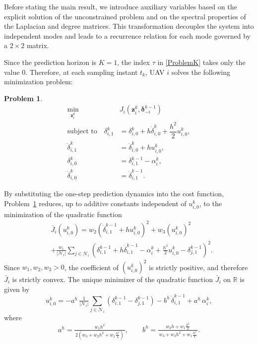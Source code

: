 \documentclass[letterpaper,journal]{IEEEtran}
\newtheorem{problem}{Problem}
\begin{document}
Before stating the main result, we introduce auxiliary variables based on the explicit solution of the unconstrained problem and on the spectral properties of the Laplacian and degree matrices. This transformation decouples the system into independent modes and leads to a recurrence relation for each mode governed by a \(2\times 2\) matrix.

Since the prediction horizon is \(K=1\), the index \(\tau\) in \eqref{ProblemK} takes only the value \(0\). Therefore, at each sampling instant \(t_k\), UAV \(i\) solves the following minimization problem:
\begin{problem}\label{DiscreteUn} 
\begin{equation*}
\begin{aligned}
\min_{\mathbf{z}^{k}_{i}} \quad 
& J_i\!\left(\mathbf{z}^{k}_{i}, \bm{\delta}^{k-1}_{-i}\right)
\\
\text{subject to} \quad
\delta_{i,1}^k
&=
\delta_{i,0}^k
+
h\dot\delta_{i,0}^k
+
\dfrac{h^2}{2}u_{i,0}^k,
\\[3pt]
\dot\delta_{i,1}^k
&=
\dot\delta_{i,0}^k
+
hu_{i,0}^k,
\\[3pt]
\delta^{k}_{i,0}
&=
\delta^{k-1}_{i,1}
-
\alpha_{i}^{k},
\\[3pt]
\dot{\delta}^{k}_{i,0}
&=
\dot{\delta}^{k-1}_{i,1}.
\end{aligned}
\end{equation*}
\end{problem}

By substituting the one-step prediction dynamics into the cost function, Problem~\ref{DiscreteUn} reduces, up to additive constants independent of \(u_{i,0}^k\), to the minimization of the quadratic function
\begin{equation}\label{ProblemK1}
\begin{split}
&\bar J_i(u^k_{i,0})
=
w_2(\dot\delta^{k-1}_{i,1}+hu^k_{i,0})^2
+
w_3(u^k_{i,0})^2
\\
&+
\tfrac{w_1}{|\mathcal N_i|}
\sum_{j\in \mathcal N_i}
(
\delta^{k-1}_{i,1}
+h\dot\delta^{k-1}_{i,1}
-\alpha_i^{k}
+\tfrac{h^2}{2}u^k_{i,0}
-\delta^{k-1}_{j,1}
)^2 .
\end{split}
\end{equation}
Since \(w_1,w_2,w_3>0\), the coefficient of \((u_{i,0}^k)^2\) is strictly positive, and therefore \(\bar J_i\) is strictly convex.
The unique minimizer of the quadratic function \(\bar J_i\) on \(\mathbb R\) is given by
\begin{equation}\label{control}
u^k_{i,0}
=
-a^h\,\tfrac{1}{|\mathcal N_i|}\sum_{j\in\mathcal N_i}
(\delta^{k-1}_{i,1}-\delta^{k-1}_{j,1})
-b^h\,\dot\delta^{k-1}_{i,1}
+a^h\,\alpha_i^{k},
\end{equation}
where
\[
a^h
=
\tfrac{w_1h^2}{\,2(w_3+w_2h^2+w_1\frac{h^4}{4})\,},
\qquad
b^h
=
\tfrac{w_2h+w_1\frac{h^3}{2}}{\,w_3+w_2h^2+w_1\frac{h^4}{4}\,}.
\]
\end{document}

